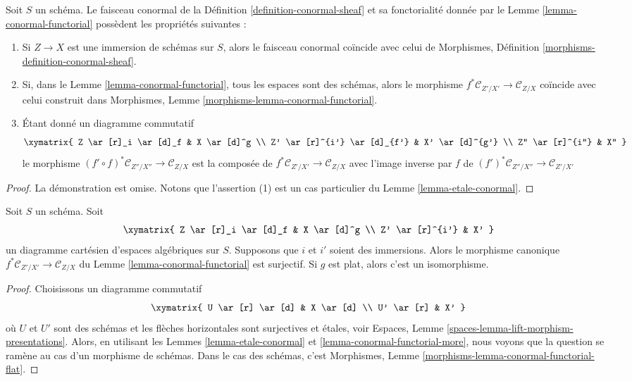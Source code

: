 \begin{lemma}
\label{lemma-conormal-functorial-more}
Soit $S$ un schéma. Le faisceau conormal de la
Définition \ref{definition-conormal-sheaf} et sa fonctorialité donnée par le
Lemme \ref{lemma-conormal-functorial}
possèdent les propriétés suivantes :
\begin{enumerate}
\item Si $Z \to X$ est une immersion de schémas sur $S$, alors le faisceau
conormal coïncide avec celui de
Morphismes, Définition \ref{morphisms-definition-conormal-sheaf}.
\item Si, dans le
Lemme \ref{lemma-conormal-functorial},
tous les espaces sont des schémas, alors le morphisme
$f^*\mathcal{C}_{Z'/X'} \to \mathcal{C}_{Z/X}$ coïncide
avec celui construit dans
Morphismes, Lemme \ref{morphisms-lemma-conormal-functorial}.
\item Étant donné un diagramme commutatif
$$
\xymatrix{
Z \ar[r]_i \ar[d]_f & X \ar[d]^g \\
Z' \ar[r]^{i'} \ar[d]_{f'} & X' \ar[d]^{g'} \\
Z'' \ar[r]^{i''} & X''
}
$$
le morphisme $(f' \circ f)^*\mathcal{C}_{Z''/X''} \to \mathcal{C}_{Z/X}$
est la composée de
$f^*\mathcal{C}_{Z'/X'} \to \mathcal{C}_{Z/X}$
avec l'image inverse par $f$ de
$(f')^*\mathcal{C}_{Z''/X''} \to \mathcal{C}_{Z'/X'}$
\end{enumerate}
\end{lemma}

\begin{proof}
La démonstration est omise. Notons que l'assertion (1) est un cas particulier du
Lemme \ref{lemma-etale-conormal}.
\end{proof}

\begin{lemma}
\label{lemma-conormal-functorial-flat}
Soit $S$ un schéma. Soit
$$
\xymatrix{
Z \ar[r]_i \ar[d]_f & X \ar[d]^g \\
Z' \ar[r]^{i'} & X'
}
$$
un diagramme cartésien d'espaces algébriques sur $S$. Supposons
que $i$ et $i'$ soient des immersions. Alors le morphisme canonique
$f^*\mathcal{C}_{Z'/X'} \to \mathcal{C}_{Z/X}$ du
Lemme \ref{lemma-conormal-functorial}
est surjectif. Si $g$ est plat, alors c'est un isomorphisme.
\end{lemma}

\begin{proof}
Choisissons un diagramme commutatif
$$
\xymatrix{
U \ar[r] \ar[d] & X \ar[d] \\
U' \ar[r] & X'
}
$$
où $U$ et $U'$ sont des schémas et les flèches horizontales sont surjectives
et étales, voir
Espaces, Lemme \ref{spaces-lemma-lift-morphism-presentations}.
Alors, en utilisant les
Lemmes \ref{lemma-etale-conormal} et \ref{lemma-conormal-functorial-more},
nous voyons que la question se ramène au cas d'un morphisme de schémas.
Dans le cas des schémas, c'est
Morphismes, Lemme \ref{morphisms-lemma-conormal-functorial-flat}.
\end{proof}

